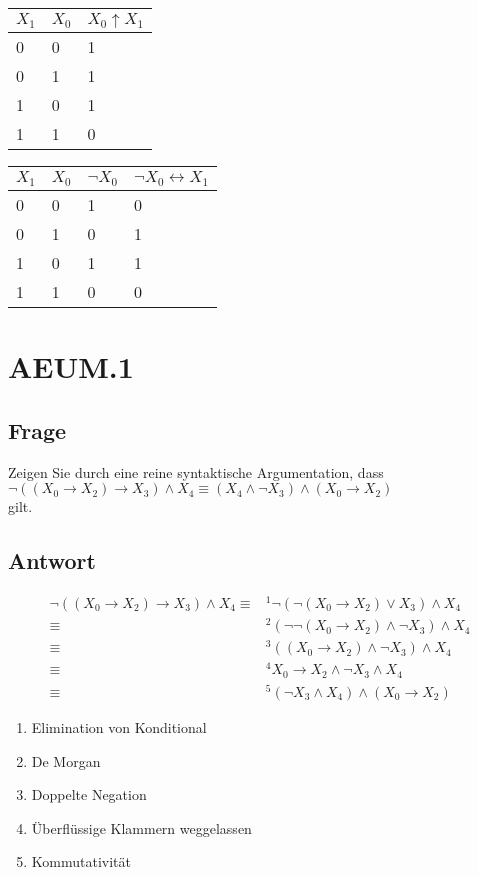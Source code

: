 \documentclass[12pt, a4paper]{article}
\begin{document}
\begin{tabular}{|l|l|l|}
\hline
$X_1$ & $X_0$ & $X_0 \uparrow X_1$\\ \hline
0 & 0 & 1\\
0 & 1 & 1\\
1 & 0 & 1\\
1 & 1 & 0\\
\hline
\end{tabular}

\begin{tabular}{|l|l|l|l|}
\hline
$X_1$ & $X_0$ & $\neg X_0$ & $\neg X_0 \leftrightarrow X_1$\\ \hline
0 & 0 & 1 & 0\\
0 & 1 & 0 & 1\\
1 & 0 & 1 & 1\\
1 & 1 & 0 & 0\\
\hline
\end{tabular}

\section*{AEUM.1}
\subsection*{Frage}
Zeigen Sie durch eine reine syntaktische Argumentation, dass\\
$\neg ((X_0 \rightarrow X_2) \rightarrow X_3) \wedge X_4 \equiv (X_4 \wedge \neg X_3) \wedge (X_0 \rightarrow X_2)$\\
gilt.
\subsection*{Antwort}
\begin{equation}
\begin{split}
\neg((X_0 \rightarrow X_2) \rightarrow X_3) \wedge X_4
\equiv&^1 \neg(\neg(X_0 \rightarrow X_2) \vee X_3) \wedge X_4\\
\equiv&^2 (\neg\neg(X_0 \rightarrow X_2) \wedge \neg X_3) \wedge X_4\\
\equiv&^3 ((X_0 \rightarrow X_2) \wedge \neg X_3) \wedge X_4\\
\equiv&^4 X_0 \rightarrow X_2 \wedge \neg X_3 \wedge X_4\\
\equiv&^5 (\neg X_3 \wedge X_4) \wedge (X_0 \rightarrow X_2)
\end{split}
\end{equation}

\begin{enumerate}
\item Elimination von Konditional
\item De Morgan
\item Doppelte Negation
\item Überflüssige Klammern weggelassen
\item Kommutativität
\end{enumerate}
\end{document}
